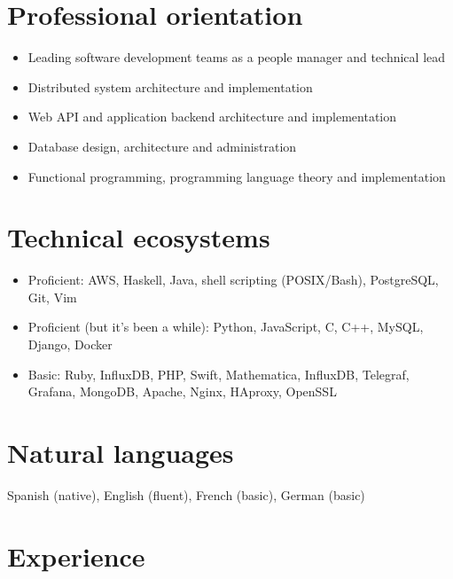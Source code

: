 \documentclass{res}
\begin{document}
\address{%
  \textbf{Computer engineering}, Universidad Sim\'on Bol\'{\i}var, Venezuela
  \\ Berlin, Germany
  \\ 1988--01--15
}
\address{%
  +49 (176) 36 53 49 72
  \\ \textsc{targen@gmail.com}
  \\ \textsc{https://keybase.io/mgomezch}
}

\begin{resume}

  \section{Professional orientation}
    \begin{itemize}
      \item Leading software development teams as a people manager and technical lead
      \item Distributed system architecture and implementation
      \item Web API and application backend architecture and implementation
      \item Database design, architecture and administration
      \item Functional programming, programming language theory and implementation
    \end{itemize}

  \section{Technical ecosystems}
    \begin{itemize}
      \item Proficient: AWS, Haskell, Java, shell scripting (POSIX/Bash), PostgreSQL, Git, Vim
      \item Proficient (but it's been a while): Python, JavaScript, C, C++, MySQL, Django, Docker
      \item Basic: Ruby, InfluxDB, PHP, Swift, Mathematica, InfluxDB, Telegraf, Grafana, MongoDB, Apache, Nginx, HAproxy, OpenSSL
    \end{itemize}
  \section{Natural languages}
    Spanish (native), English (fluent), French (basic), German (basic)

\section{Experience}
  \begin{itemize}[leftmargin=-0.3in]
    \setlength\itemsep{1em}


\end{itemize}
\end{resume}
\end{document}

